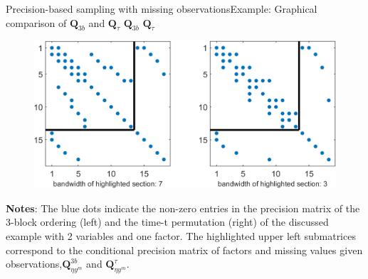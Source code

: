 \documentclass[xcolor=svgnames, 10pt, aspectratio=169]{beamer}
\begin{document}
\begin{frame}{Precision-based sampling with missing observations}{Example: Graphical comparison of $\mathbf{Q}_{3b}$ and $\mathbf{Q}_{\tau}$}
    \hspace{4.5cm} $\mathbf{Q}_{3b}$ \hspace{3.7cm} $\mathbf{Q}_{\tau}$

    \vspace{0.2cm}
    \begin{adjustbox}{minipage=0.6\textwidth,center}
        \begin{figure}
            \includegraphics[scale = 0.7]{fig_Q3b_Qtau.png}  \vspace{0.1cm} \\
        \end{figure}
            {\tiny \textbf{Notes}: The blue dots indicate the non-zero entries in the precision matrix of the 3-block ordering (left) and the time-t permutation (right) of the discussed example with 2 variables and one factor. The highlighted upper left submatrices correspond to the conditional precision matrix of factors and missing values given observations,$\mathbf{Q}^{3b}_{\eta y^m}$ and $\mathbf{Q}^{\tau}_{\eta y^m}$.}\par
    \end{adjustbox}  
\end{frame}
\end{document}
